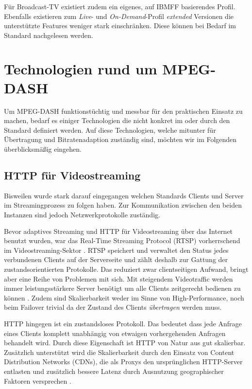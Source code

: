 \documentclass[paper = a4, fontsize = 12pt, parskip = half]{scrartcl} %
\begin{document}
Für Broadcast-TV existiert zudem ein eigenes, auf IBMFF basierendes Profil. Ebenfalls existieren zum \textit{Live}- und \textit{On-Demand}-Profil \textit{extended} Versionen die unterstützte Features weniger stark einschränken. Diese können bei Bedarf im Standard nachgelesen werden.

\section{Technologien rund um MPEG-DASH}
Um MPEG-DASH funktionstüchtig und messbar für den praktischen Einsatz zu machen, bedarf es einiger Technologien die nicht konkret im oder durch den Standard definiert werden. Auf diese Technologien, welche mitunter für Übertragung und Bitratenadaption zuständig sind, möchten wir im Folgenden überblicksmäßig eingehen.

\subsection{HTTP für Videostreaming}
Bisweilen wurde stark darauf eingegangen welchen Standards Clients und Server im Streamingprozess zu folgen haben. Zur Kommunikation zwischen den beiden Instanzen sind jedoch Netzwerkprotokolle zuständig.

Bevor adaptives Streaming und HTTP für Videostreaming über das Internet benutzt wurden, war das Real-Time Streaming Protocol (RTSP) vorherrschend im Videostreaming-Sektor \cite{stockhammer_dynamic_2011}. RTSP speichert und verwaltet den Status jedes verbundenen Clients auf der Serverseite und zählt deshalb zur Gattung der zustandsorientierten Protokolle. Das reduziert zwar clientseitigen Aufwand, bringt aber eine Reihe von Problemen mit sich. Mit steigendem Videotraffic werden immer leistungsstärkere Server benötigt um alle Clients zeitgerecht bedienen zu können \cite{stockhammer_dynamic_2011}. Zudem sind Skalierbarkeit weder im Sinne von High-Performance, noch beim Failover trivial da der Zustand des Clients \textit{übertragen} werden muss.

HTTP hingegen ist ein zustandsloses Protokoll. Das bedeutet dass jede Anfrage eines Clients komplett unabhängig von etwaigen vorhergehenden Anfragen behandelt wird. Durch diese Eigenschaft ist HTTP von Natur aus gut skalierbar. Zusätzlich unterstützt wird die Skalierbarkeit durch den Einsatz von Content Distribution Networks (CDNs), die als Proxys den ursprünglichen HTTP-Server entlasten und zusätzlich bessere Latenz durch Ausnutzung geographischer Faktoren versprechen \cite{buyya_content_2008}.
\end{document}
